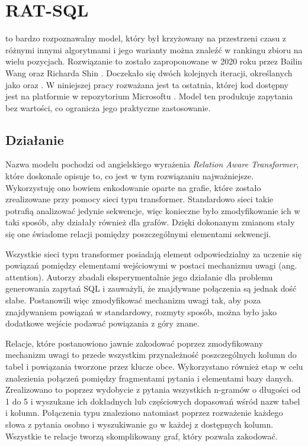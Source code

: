 \section{RAT-SQL}
 to bardzo rozpoznawalny model, który był krzyżowany na przestrzeni czasu z różnymi innymi algorytmami i jego warianty można znaleźć w rankingu zbioru  na wielu pozycjach. Rozwiązanie to zostało zaproponowane w 2020 roku przez Bailin Wang oraz Richarda Shin . Doczekało się dwóch kolejnych iteracji, określanych jako  oraz . W niniejszej pracy rozważana jest ta ostatnia, której kod dostępny jest na platformie  w repozytorium Microsoftu . Model ten produkuje zapytania bez wartości, co ogranicza jego praktyczne zastosowanie.

\subsection{Działanie}
Nazwa modelu  pochodzi od angielskiego wyrażenia \textit{Relation Aware Transformer}, które doskonale opisuje to, co jest w tym rozwiązaniu najważniejsze. Wykorzystuję ono bowiem enkodowanie oparte na grafie, które zostało zrealizowane przy pomocy sieci typu transformer. Standardowo sieci takie potrafią analizować jedynie sekwencje, więc konieczne było zmodyfikowanie ich w taki sposób, aby działały również dla grafów. Dzięki dokonanym zmianom stały się one świadome relacji pomiędzy poszczególnymi elementami sekwencji.

Wszystkie sieci typu transformer posiadają element odpowiedzialny za uczenie się powiązań pomiędzy elementami wejściowymi w postaci mechanizmu uwagi (ang. attention). Autorzy \mbox{} zbadali eksperymentalnie jego działanie dla problemu generowania zapytań SQL i zauważyli, że znajdywane połączenia są jednak dość słabe. Postanowili więc zmodyfikować mechanizm uwagi tak, aby poza znajdywaniem powiązań w standardowy, rozmyty sposób, można było jako dodatkowe wejście podawać powiązania z góry znane. 

Relacje, które postanowiono jawnie zakodować poprzez zmodyfikowany mechanizm uwagi to przede wszystkim przynależność poszczególnych kolumn do tabel i powiązania tworzone przez klucze obce. Wykorzystano również etap  w celu znalezienia połączeń pomiędzy fragmentami pytania i elementami bazy danych. Zrealizowano to poprzez wydobycie z pytania wszystkich n-gramów o długości od 1 do 5 i wyszukane ich dokładnych lub częściowych dopasowań wśród nazw tabel i kolumn. Połączenia typu  znaleziono natomiast poprzez rozważenie każdego słowa z pytania osobno i wyszukiwanie go w każdej z dostępnych kolumn. Wszystkie te relacje tworzą skomplikowany graf, który  pozwala zakodować.

